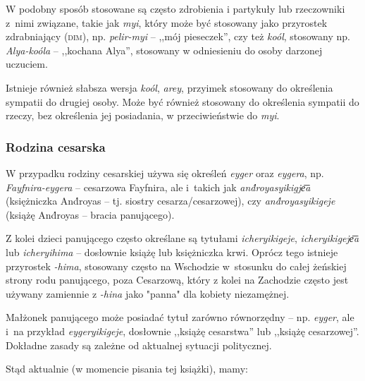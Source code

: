 \begin{spacing}{1.1}
W podobny sposób stosowane są często zdrobienia i partykuły lub rzeczowniki
z~nimi związane, takie jak \emph{myi}, który może być stosowany jako przyrostek
zdrabniający (\textsc{dim}), np. \emph{pelir-myi} -- ,,mój pieseczek'', czy też
\emph{koól}, stosowany np. \emph{Alya-koóla} -- ,,kochana Alya'', stosowany w
odniesieniu do osoby darzonej uczuciem.

Istnieje również słabsza wersja \emph{koól}, \emph{arey}, przyimek stosowany do
określenia sympatii do drugiej osoby. Może być również stosowany do określenia
sympatii do rzeczy, bez określenia jej posiadania, w przeciwieństwie do
\emph{myi}.

\subsubsection{Rodzina cesarska}

W przypadku rodziny cesarskiej używa się określeń \emph{eyger} oraz
\emph{eygera}, np. \emph{Fayfnira-eygera} -- cesarzowa Fayfnira, ale i~takich
jak \emph{and́royasyikigje͞a} (księżniczka And́royas -- tj. siostry
cesarza/cesarzowej), czy \emph{and́royasyikigeje} (książę And́royas -- bracia
panującego).

Z kolei dzieci panującego często określane są tytułami \emph{icheryikigeje},
\emph{icheryikigeje͞a} lub \emph{icheryihima} -- dosłownie książę lub
księżniczka krwi. Oprócz tego istnieje przyrostek \emph{-hima}, stosowany często
na Wschodzie w~stosunku do całej żeńskiej strony rodu panującego, poza
Cesarzową, który z kolei na Zachodzie często jest używany zamiennie z
\emph{-hina} jako "panna" dla kobiety niezamężnej.

Małżonek panującego może posiadać tytuł zarówno równorzędny -- np. \emph{eyger},
ale i~na przykład \emph{eygeryikigeje}, dosłownie ,,książę cesarstwa'' lub
,,książę cesarzowej''. Dokładne zasady są zależne od aktualnej sytuacji
politycznej.

Stąd aktualnie (w momencie pisania tej książki), mamy:


\end{spacing}
